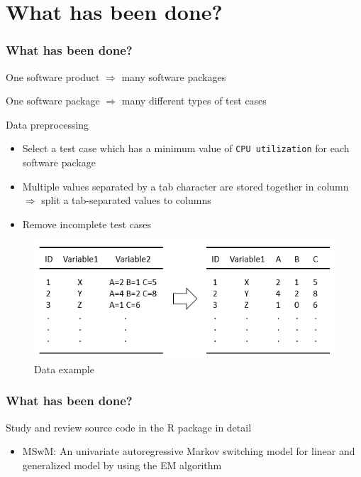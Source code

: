 \documentclass{beamer}
\begin{document}

\section{What has been done?}

\begin{frame}
\frametitle{What has been done?}
One software product $\Rightarrow$ many software packages
	
One software package $\Rightarrow$ many different types of test cases

\vspace{3mm}

Data preprocessing 

\begin{itemize}
	\item Select a test case which has a minimum value of \texttt{CPU utilization} for each software package
	\item Multiple values separated by a tab character are stored together in column $\Rightarrow$ split a tab-separated values to columns
	\item Remove incomplete test cases 
	
\end{itemize}
	
\begin{figure}
	\includegraphics[width=0.55\linewidth]{table4}
	\caption{Data example}
\end{figure}

\end{frame}


\begin{frame}
\frametitle{What has been done?}
Study and review source code  in the R package in detail
\begin{itemize}
	\item MSwM: An univariate autoregressive Markov switching model for linear and generalized model by using the EM algorithm \cite{p3}
\end{itemize}
\end{frame}
\end{document}
